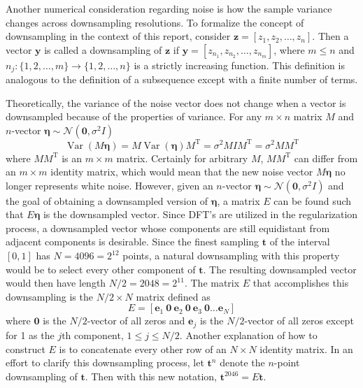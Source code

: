 \documentclass[12pt]{article}
\newcommand{\tdis}{\mathbf{t}}
\newcommand{\trans}{\mathrm{T}}	%
\newcommand{\noiseSD}{\sigma}	%
\newcommand{\noise}{\bm{\eta}}	%
\newcommand{\Var}{\operatorname{Var}}	%
\begin{document}
Another numerical consideration regarding noise is how the sample variance changes across downsampling resolutions. To formalize the concept of downsampling in the context of this report, consider $\mathbf{z} = [z_1,z_2,\ldots,z_n]$. Then a vector $\mathbf{y}$ is called a downsampling of $\mathbf{z}$ if $\mathbf{y} = [z_{n_1},z_{n_2},\ldots,z_{n_m}]$, where $m \leq n$ and $n_j:\{1,2,\ldots,m\}\rightarrow\{1,2,\ldots,n\}$ is a strictly increasing function. This definition is analogous to the definition of a subsequence except with a finite number of terms. \par
Theoretically, the variance of the noise vector does not change when a vector is downsampled because of the properties of variance. For any $m\times n$ matrix $M$ and $n$-vector $\noise \sim \mathcal{N}(\bm{0},\noiseSD^2I)$
\begin{equation}
\Var(M\noise) = M\Var(\noise)M^{\trans} = \noiseSD^2MIM^{\trans} = \noiseSD^2MM^{\trans}
\label{Eq_VarProp}
\end{equation}
where $MM^\trans$ is an $m \times m$ matrix. Certainly for arbitrary $M$, $MM^\trans$ can differ from an $m \times m$ identity matrix, which would mean that the new noise vector $M\noise$ no longer represents white noise. However, given an $n$-vector $\noise \sim \mathcal{N}(\bm{0},\noiseSD^2I)$ and the goal of obtaining a downsampled version of $\noise$, a matrix $E$ can be found such that $E\noise$ is the downsampled vector. Since DFT's are utilized in the regularization process, a downsampled vector whose components are still equidistant from adjacent components is desirable. Since the finest sampling $\tdis$ of the interval $[0,1]$ has $N = 4096 = 2^{12}$ points, a natural downsampling with this property would be to select every other component of $\tdis$. The resulting downsampled vector would then have length $N/2 = 2048 = 2^{11}$. The matrix $E$ that accomplishes this downsampling is the $N/2 \times N$ matrix defined as
\begin{equation}
E = [\mathbf{e}_1 \: \mathbf{0} \: \mathbf{e}_2 \: \mathbf{0} \: \mathbf{e}_3 \: \mathbf{0} \ldots \mathbf{e}_N]
\label{Eq_E}
\end{equation}
where $\mathbf{0}$ is the $N/2$-vector of all zeros and $\mathbf{e}_j$ is the $N/2$-vector of all zeros except for 1 as the $j\text{th}$ component, $1 \leq j \leq N/2$. Another explanation of how to construct $E$ is to concatenate every other row of an $N \times N$ identity matrix. In an effort to clarify this downsampling process, let $\tdis^{n}$ denote the $n$-point downsampling of $\tdis$. Then with this new notation, $\tdis^{2046} = E\tdis$. \par
\end{document}

